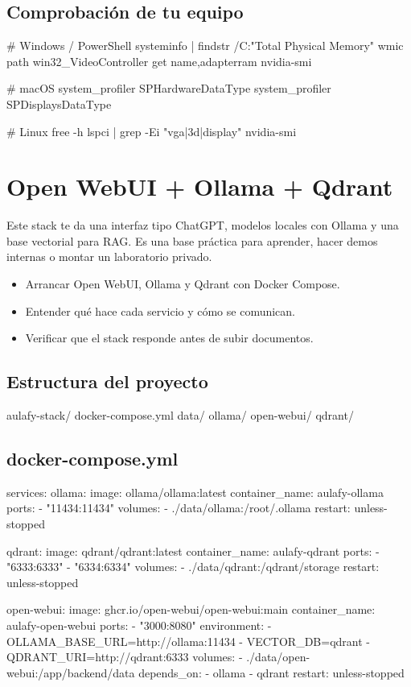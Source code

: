 \documentclass[11pt,a4paper]{book}
\begin{document}
\section{Comprobación de tu equipo}
\begin{codebox}
# Windows / PowerShell
systeminfo | findstr /C:"Total Physical Memory"
wmic path win32_VideoController get name,adapterram
nvidia-smi

# macOS
system_profiler SPHardwareDataType
system_profiler SPDisplaysDataType

# Linux
free -h
lspci | grep -Ei "vga|3d|display"
nvidia-smi
\end{codebox}
\chapter{Open WebUI + Ollama + Qdrant}
Este stack te da una interfaz tipo ChatGPT, modelos locales con Ollama y una base vectorial para RAG. Es una base práctica para aprender, hacer demos internas o montar un laboratorio privado.

\begin{itemize}\item Arrancar Open WebUI, Ollama y Qdrant con Docker Compose.\end{itemize}
\begin{itemize}\item Entender qué hace cada servicio y cómo se comunican.\end{itemize}
\begin{itemize}\item Verificar que el stack responde antes de subir documentos.\end{itemize}
\section{Estructura del proyecto}
\begin{codebox}
aulafy-stack/
  docker-compose.yml
  data/
    ollama/
    open-webui/
    qdrant/
\end{codebox}
\section{docker-compose.yml}
\begin{codebox}
services:
  ollama:
    image: ollama/ollama:latest
    container_name: aulafy-ollama
    ports:
      - "11434:11434"
    volumes:
      - ./data/ollama:/root/.ollama
    restart: unless-stopped

  qdrant:
    image: qdrant/qdrant:latest
    container_name: aulafy-qdrant
    ports:
      - "6333:6333"
      - "6334:6334"
    volumes:
      - ./data/qdrant:/qdrant/storage
    restart: unless-stopped

  open-webui:
    image: ghcr.io/open-webui/open-webui:main
    container_name: aulafy-open-webui
    ports:
      - "3000:8080"
    environment:
      - OLLAMA_BASE_URL=http://ollama:11434
      - VECTOR_DB=qdrant
      - QDRANT_URI=http://qdrant:6333
    volumes:
      - ./data/open-webui:/app/backend/data
    depends_on:
      - ollama
      - qdrant
    restart: unless-stopped
\end{codebox}
\end{document}
